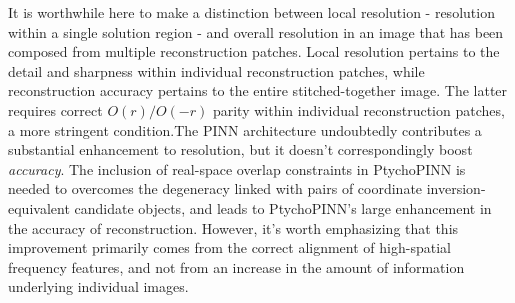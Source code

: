 \documentclass[sn-mathphys]{sn-jnl}%
\theoremstyle{thmstyleone}%
\theoremstyle{thmstyletwo}%
\theoremstyle{thmstylethree}%
\begin{document}
It is worthwhile here to make a distinction between local resolution - resolution within a single solution region - and overall resolution in an image that has been composed from multiple reconstruction patches. Local resolution pertains to the detail and sharpness within individual reconstruction patches, while reconstruction accuracy pertains to the entire stitched-together image. The latter requires correct $O(r) / O(-r)$ parity within individual reconstruction patches, a more stringent condition.The PINN architecture undoubtedly contributes a substantial enhancement to resolution, but it doesn't correspondingly boost \emph{accuracy}. The inclusion of real-space overlap constraints in PtychoPINN is needed to overcomes the degeneracy linked with pairs of coordinate inversion-equivalent candidate objects, and leads to PtychoPINN's large enhancement in the accuracy of reconstruction.  However, it's worth emphasizing that this improvement primarily comes from the correct alignment of high-spatial frequency features, and not from an increase in the amount of information underlying individual images.%



\end{document}
